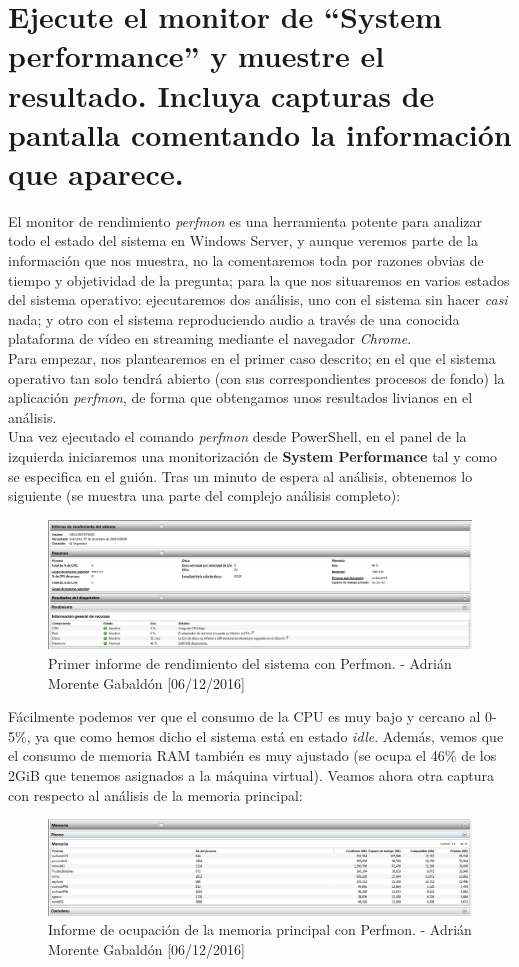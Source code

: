 \section{Ejecute el monitor de ``System performance'' y muestre el resultado. Incluya capturas de pantalla comentando la información que aparece.}
El monitor de rendimiento \emph{perfmon} es una herramienta potente para analizar todo el estado del sistema en Windows Server, y aunque veremos parte de la información que nos muestra, no la comentaremos toda por razones obvias de tiempo y objetividad de la pregunta; para la que nos situaremos en varios estados del sistema operativo: ejecutaremos dos análisis, uno con el sistema sin hacer \textit{casi} nada; y otro con el sistema reproduciendo audio a través de una conocida plataforma de vídeo en streaming mediante el navegador \emph{Chrome}. \\
Para empezar, nos plantearemos en el primer caso descrito; en el que el sistema operativo tan solo tendrá abierto (con sus correspondientes procesos de fondo) la aplicación \emph{perfmon}, de forma que obtengamos unos resultados livianos en el análisis. \\ Una vez ejecutado el comando \emph{perfmon} desde PowerShell, en el panel de la izquierda iniciaremos una monitorización de \textbf{System Performance} tal y como se especifica en el guión. Tras un minuto de espera al análisis, obtenemos lo siguiente (se muestra una parte del complejo análisis completo):
\begin{figure}[H]
	\centering
	\includegraphics[scale=0.6]{perfmon-1}
	\caption{Primer informe de rendimiento del sistema con Perfmon. - Adrián Morente Gabaldón [06/12/2016]}
	\label{figura9}
\end{figure}
Fácilmente podemos ver que el consumo de la CPU es muy bajo y cercano al 0-5\%, ya que como hemos dicho el sistema está en estado \emph{idle}. Además, vemos que el consumo de memoria RAM también es muy ajustado (se ocupa el 46\% de los 2GiB que tenemos asignados a la máquina virtual). Veamos ahora otra captura con respecto al análisis de la memoria principal:
\begin{figure}[H]
	\centering
	\includegraphics[scale=0.6]{perfmon-2}
	\caption{Informe de ocupación de la memoria principal con Perfmon. - Adrián Morente Gabaldón [06/12/2016]}
	\label{figura10}
\end{figure}
